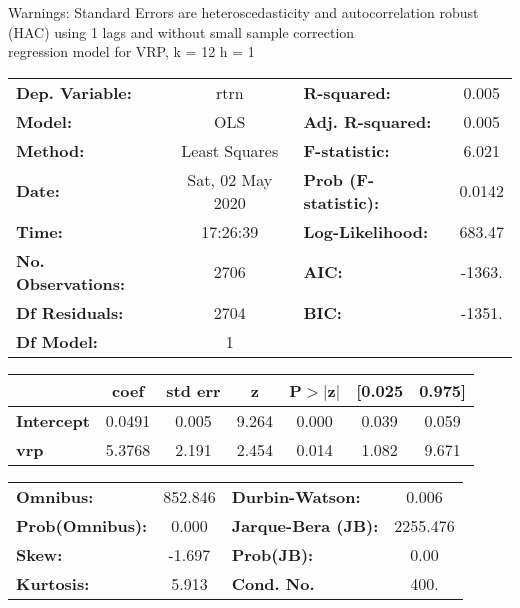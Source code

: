Warnings: \newline
 [1] Standard Errors are heteroscedasticity and autocorrelation robust (HAC) using 1 lags and without small sample correction\\ 

regression model for VRP, k = 12 h = 1\begin{center}
\begin{tabular}{lclc}
\toprule
\textbf{Dep. Variable:}    &       rtrn       & \textbf{  R-squared:         } &     0.005   \\
\textbf{Model:}            &       OLS        & \textbf{  Adj. R-squared:    } &     0.005   \\
\textbf{Method:}           &  Least Squares   & \textbf{  F-statistic:       } &     6.021   \\
\textbf{Date:}             & Sat, 02 May 2020 & \textbf{  Prob (F-statistic):} &   0.0142    \\
\textbf{Time:}             &     17:26:39     & \textbf{  Log-Likelihood:    } &    683.47   \\
\textbf{No. Observations:} &        2706      & \textbf{  AIC:               } &    -1363.   \\
\textbf{Df Residuals:}     &        2704      & \textbf{  BIC:               } &    -1351.   \\
\textbf{Df Model:}         &           1      & \textbf{                     } &             \\
\bottomrule
\end{tabular}
\begin{tabular}{lcccccc}
                   & \textbf{coef} & \textbf{std err} & \textbf{z} & \textbf{P$> |$z$|$} & \textbf{[0.025} & \textbf{0.975]}  \\
\midrule
\textbf{Intercept} &       0.0491  &        0.005     &     9.264  &         0.000        &        0.039    &        0.059     \\
\textbf{vrp}       &       5.3768  &        2.191     &     2.454  &         0.014        &        1.082    &        9.671     \\
\bottomrule
\end{tabular}
\begin{tabular}{lclc}
\textbf{Omnibus:}       & 852.846 & \textbf{  Durbin-Watson:     } &    0.006  \\
\textbf{Prob(Omnibus):} &   0.000 & \textbf{  Jarque-Bera (JB):  } & 2255.476  \\
\textbf{Skew:}          &  -1.697 & \textbf{  Prob(JB):          } &     0.00  \\
\textbf{Kurtosis:}      &   5.913 & \textbf{  Cond. No.          } &     400.  \\
\bottomrule
\end{tabular}
\end{center}

